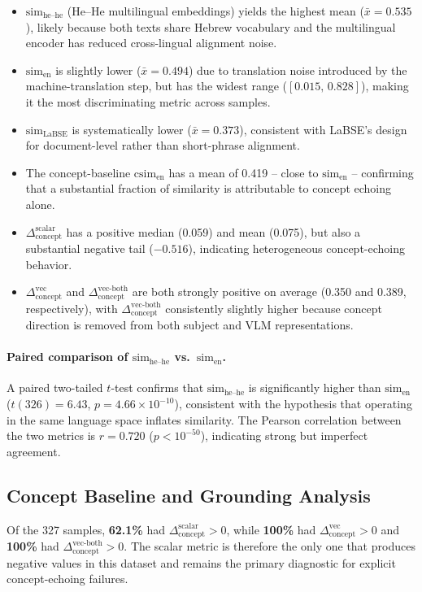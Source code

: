\documentclass[12pt,a4paper]{article}
\newcommand{\simEN}{\ensuremath{\mathrm{sim}_{\text{en}}}}
\newcommand{\simHH}{\ensuremath{\mathrm{sim}_{\text{he--he}}}}
\newcommand{\simLaBSE}{\ensuremath{\mathrm{sim}_{\text{LaBSE}}}}
\newcommand{\csim}{\ensuremath{\mathrm{csim}_{\text{en}}}}
\newcommand{\SACs}{\ensuremath{\Delta_{\text{concept}}^{\text{scalar}}}}
\newcommand{\SACv}{\ensuremath{\Delta_{\text{concept}}^{\text{vec}}}}
\newcommand{\SACvb}{\ensuremath{\Delta_{\text{concept}}^{\text{vec-both}}}}
\begin{document}
\begin{itemize}
  \item \simHH{} (He--He multilingual embeddings) yields the highest mean
        ($\bar{x}=0.535$), likely because both texts share Hebrew vocabulary
        and the multilingual encoder has reduced cross-lingual alignment noise.
  \item \simEN{} is slightly lower ($\bar{x}=0.494$) due to translation noise
        introduced by the machine-translation step, but has the widest range
        ($[0.015,\,0.828]$), making it the most discriminating metric across samples.
  \item \simLaBSE{} is systematically lower ($\bar{x}=0.373$), consistent with
        LaBSE's design for document-level rather than short-phrase alignment.
  \item The concept-baseline \csim{} has a mean of 0.419 -- close to \simEN{} -- 
        confirming that a substantial fraction of similarity is attributable to
        concept echoing alone.
  \item \SACs{} has a positive median (0.059) and mean (0.075), but also a substantial
        negative tail ($-0.516$), indicating heterogeneous concept-echoing behavior.
  \item \SACv{} and \SACvb{} are both strongly positive on average (0.350 and 0.389,
        respectively), with \SACvb{} consistently slightly higher because concept
        direction is removed from both subject and VLM representations.
\end{itemize}

\paragraph{Paired comparison of \simHH{} vs.\ \simEN{}.}
A paired two-tailed $t$-test confirms that \simHH{} is significantly higher than
\simEN{} ($t(326)=6.43$, $p=4.66\times10^{-10}$), consistent with the hypothesis that
operating in the same language space inflates similarity.  The Pearson correlation
between the two metrics is $r=0.720$ ($p<10^{-50}$), indicating strong but imperfect
agreement.

\subsection{Concept Baseline and Grounding Analysis}

Of the 327 samples, \textbf{62.1\%} had $\SACs{}>0$, while \textbf{100\%} had
$\SACv{}>0$ and \textbf{100\%} had $\SACvb{}>0$.
The scalar metric is therefore the only one that produces negative values in this
dataset and remains the primary diagnostic for explicit concept-echoing failures.
\end{document}
